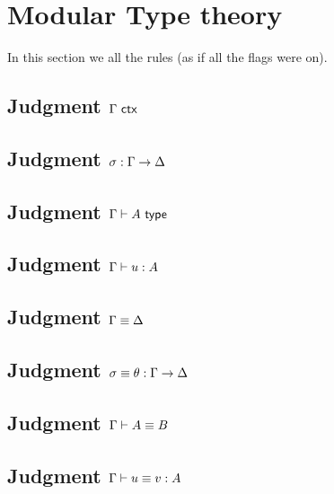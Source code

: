 \documentclass{article}
\begin{document}


\section*{Modular Type theory}
\label{sec:type-theory}

In this section we all the rules (as if all the flags were on).

\subsection*{Judgment $\Gamma\ \mathsf{ctx}$}

\showIsctxRules

\subsection*{Judgment $\sigma : \Gamma \to \Delta$}

\showIssubstRules

\subsection*{Judgment $\Gamma \vdash A \ \mathsf{type}$}

\showIstypeRules

\subsection*{Judgment $\Gamma \vdash u : A$}

\showIstermRules

\subsection*{Judgment $\Gamma \equiv \Delta$}

\showEqctxRules

\subsection*{Judgment $\sigma \equiv \theta : \Gamma \to \Delta$}

\showEqsubstRules

\subsection*{Judgment $\Gamma \vdash A \equiv B$}

\showEqtypeRules

\subsection*{Judgment $\Gamma \vdash u \equiv v : A$}

\showEqtermRules
\end{document}
